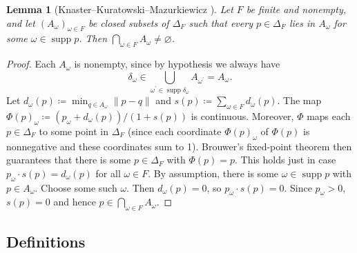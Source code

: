 \documentclass[11pt]{article}
\newtheorem{lemma}[theorem]{Lemma}
\theoremstyle{definition}
\theoremstyle{remark}
\newcommand{\supp}{\operatorname{supp}}
\begin{document}
\begin{lemma}[Knaster--Kuratowski--Mazurkiewicz {\cite{KKM1929}}]\label{lem:kkm}
Let $F$ be finite and nonempty, and let $(A_\omega)_{\omega\in F}$ be closed subsets of $\Delta_F$ such that every $p\in\Delta_F$ lies in $A_\omega$ for some $\omega\in\supp p$. Then $\bigcap_{\omega\in F}A_\omega\ne\varnothing$.
\end{lemma}
\begin{proof}
Each $A_\omega$ is nonempty, since by hypothesis we always have
\[
\delta_\omega\in\bigcup_{\omega^\prime\in\supp \delta_\omega}A_{\omega^\prime}=A_\omega.
\]
Let $d_\omega(p)\coloneqq\min_{q\in A_\omega}\lVert p-q \rVert$ and $s(p)\coloneqq\sum_{\omega\in F} d_\omega(p)$. The map $\Phi(p)_\omega\coloneqq(p_\omega+d_\omega(p))/(1+s(p))$ is continuous. Moreover, $\Phi$ maps each $p\in\Delta_F$ to some point in $\Delta_F$ (since each coordinate $\Phi(p)_\omega$ of $\Phi(p)$ is nonnegative and these coordinates sum to 1). Brouwer's fixed-point theorem then guarantees that there is some $p\in\Delta_F$ with $\Phi(p)=p$. This holds just in case $p_\omega\cdot s(p)=d_\omega(p)$ for all $\omega\in F$. By assumption, there is some $\omega\in\supp p$ with $p\in A_\omega$. Choose some such $\omega$. Then $d_\omega(p)=0$, so $p_\omega\cdot s(p)=0$. Since $p_\omega>0$, $s(p)=0$ and hence $p\in\bigcap_{\omega\in F}A_\omega$.
\end{proof}

\subsection{Definitions}
\end{document}
